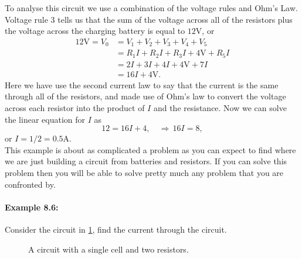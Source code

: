 To analyse this circuit we use a combination of the voltage rules and Ohm's Law.  Voltage rule 3 tells us that the sum of the voltage across all of the resistors plus the voltage across the charging battery is equal to $12\text{V}$, or
\begin{equation*}
\begin{split}
12\text{V}=V_{0}&=V_{1}+V_{2}+V_{3}+V_{4}+V_{5}\\
&=R_{1}I+R_{2}I+R_{3}I+4\text{V}+R_{5}I\\
&=2I+3I+4I+4\text{V}+7I\\
&=16I+4\text{V}.
\end{split}
\end{equation*}
Here we have use the second current law to say that the current is the same through all of the resistors, and made use of Ohm's law to convert the voltage across each resistor into the product of $I$ and the resistance. Now we can solve the linear equation for $I$ as
\begin{equation*}
12=16I+4, \quad \Rightarrow \, 16I=8,
\end{equation*}
or $I=1/2=0.5\text{A}$.\\

This example is about as complicated a problem as you can expect to find where we are just building a circuit from batteries and resistors. If you can solve this problem then you will be able to solve pretty much any problem that you are confronted by.

\paragraph{Example 8.6:} Consider the circuit in \cref{fig: 2 resistors}, find the current through the circuit.\\

  \begin{figure}[ht]
    \centering
    \caption{A circuit with a single cell and two resistors.}
    \label{fig: 2 resistors}
\end{figure}

